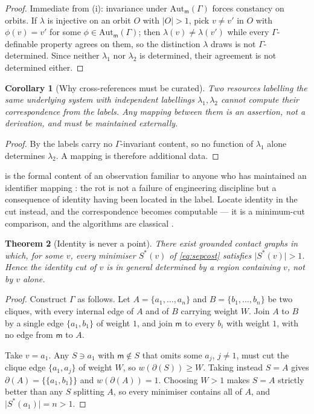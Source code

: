 \documentclass[11pt,twocolumn,a4paper]{article}
\theoremstyle{thmstyle}
\newtheorem{theorem}{Theorem}[section]
\newtheorem{corollary}[theorem]{Corollary}
\theoremstyle{definition}
\theoremstyle{remark}
\newcommand{\Gph}{\Gamma}
\newcommand{\wt}{w}
\newcommand{\med}{\mathsf{m}}
\newcommand{\cut}{\partial}
\newcommand{\abs}[1]{\lvert#1\rvert}
\begin{document}
\begin{proof}
Immediate from (i): invariance under
$\mathrm{Aut}_\med(\Gph)$ forces constancy on orbits. If $\lambda$ is
injective on an orbit $O$ with $\abs{O} > 1$, pick $v \neq v'$ in $O$
with $\phi(v) = v'$ for some $\phi \in \mathrm{Aut}_\med(\Gph)$; then
$\lambda(v) \neq \lambda(v')$ while every $\Gph$-definable property
agrees on them, so the distinction $\lambda$ draws is not
$\Gph$-determined. Since neither $\lambda_1$ nor $\lambda_2$ is
determined, their agreement is not determined either.
\end{proof}

\begin{corollary}[Why cross-references must be curated]
\label{cor:crossref}
Two resources labelling the same underlying system with independent
labellings $\lambda_1,\lambda_2$ cannot compute their correspondence
from the labels. Any mapping between them is an assertion, not a
derivation, and must be maintained externally.
\end{corollary}

\begin{proof}
By  the labels carry no $\Gph$-invariant content,
so no function of $\lambda_1$ alone determines $\lambda_2$. A mapping
is therefore additional data.
\end{proof}

 is the formal content of an observation familiar to
anyone who has maintained an identifier mapping
\citep{mcmurry2017,wren2008}: the rot is not a failure of engineering
discipline but a consequence of identity having been located in the
label. Locate identity in the cut instead, and the correspondence
becomes computable --- it is a minimum-cut comparison, and the
algorithms are classical \citep{gomory1961,stoer1997}.

\begin{theorem}[Identity is never a point]
\label{thm:region}
There exist grounded contact graphs in which, for some $v$, every
minimiser $S^{*}(v)$ of \eqref{eq:sepcost} satisfies
$\abs{S^{*}(v)} > 1$. Hence the identity cut of $v$ is in general
determined by a region containing $v$, not by $v$ alone.
\end{theorem}

\begin{proof}
Construct $\Gph$ as follows. Let $A = \{a_1,\dots,a_n\}$ and
$B = \{b_1,\dots,b_n\}$ be two cliques, with every internal edge of
$A$ and of $B$ carrying weight $W$. Join $A$ to $B$ by a single edge
$\{a_1,b_1\}$ of weight $1$, and join $\med$ to every $b_i$ with
weight $1$, with no edge from $\med$ to $A$.

Take $v = a_1$. Any $S \ni a_1$ with $\med \notin S$ that omits some
$a_j$, $j \neq 1$, must cut the clique edge $\{a_1,a_j\}$ of weight
$W$, so $\wt(\cut(S)) \geq W$. Taking instead $S = A$ gives
$\cut(A) = \{\{a_1,b_1\}\}$ and $\wt(\cut(A)) = 1$. Choosing $W > 1$
makes $S = A$ strictly better than any $S$ splitting $A$, so every
minimiser contains all of $A$, and $\abs{S^{*}(a_1)} = n > 1$.
\end{proof}
\end{document}
